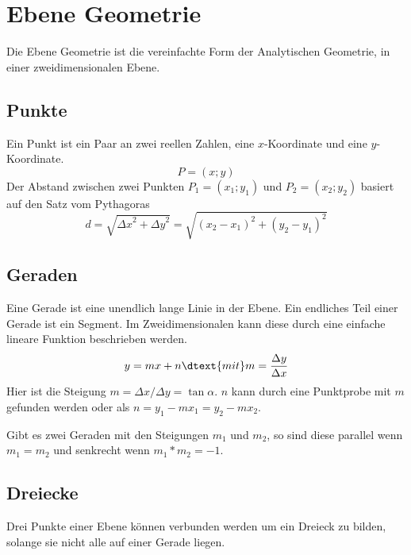 \documentclass{article}
\begin{document}
\section{Ebene Geometrie} 
Die Ebene Geometrie ist die vereinfachte Form der Analytischen Geometrie, in einer zweidimensionalen Ebene.

\subsection{Punkte}
Ein Punkt ist ein Paar an zwei reellen Zahlen, eine $x$-Koordinate und eine $y$-Koordinate.
\[
 P = (x;y)
\]
Der Abstand zwischen zwei Punkten $P_1 = (x_1;y_1)$ und $P_2 = (x_2;y_2)$ basiert auf den Satz vom Pythagoras
\[
 d = \sqrt{{\Delta x}^2 + {\Delta y}^2} = \sqrt{(x_2-x_1)^2 + (y_2-y_1)^2}
\]

\subsection{Geraden}
Eine Gerade ist eine unendlich lange Linie in der Ebene. Ein endliches Teil einer Gerade ist ein Segment. Im Zweidimensionalen kann diese durch eine einfache lineare Funktion beschrieben werden.
\[
 y = mx+n \dtext{mit} m = \frac{\Delta y}{\Delta x}
\]
Hier ist die Steigung $m=\Delta x / \Delta y=\tan{\alpha}$. $n$ kann durch eine Punktprobe mit $m$ gefunden werden oder als $n = y_1-mx_1 = y_2-mx_2$.

Gibt es zwei Geraden mit den Steigungen $m_1$ und $m_2$, so sind diese parallel wenn $m_1=m_2$ und senkrecht wenn $m_1*m_2=-1$.

\subsection{Dreiecke}
Drei Punkte einer Ebene können verbunden werden um ein Dreieck zu bilden, solange sie nicht alle auf einer Gerade liegen.
\end{document}
